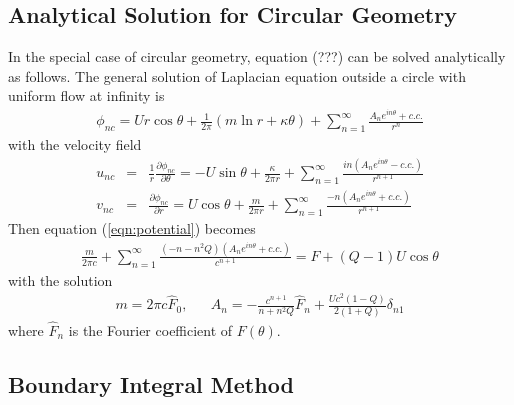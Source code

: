 \subsection{Analytical Solution for Circular Geometry}

In the special case of circular geometry, equation (???) can be solved analytically as follows. 
The general solution of Laplacian equation outside a circle with uniform flow at infinity is
 \begin{eqnarray} 
\phi_{nc} = Ur\cos\theta + \frac{1}{2\pi}(m\ln r + \kappa \theta)
+ \sum_{n=1}^{\infty} \frac{A_n e^{in\theta}+c.c. }{r^n}
\end{eqnarray}
with the velocity field
 \begin{eqnarray} 
u_{nc} & = & \frac{1}{r} \frac{\partial \phi_{nc}}{\partial \theta}  =  -U\sin\theta + \frac{\kappa}{2\pi r}
+ \sum_{n=1}^{\infty} \frac{ in (A_n e^{in\theta}-c.c.) }{r^{n+1}} \\
v_{nc} & = & \frac{\partial \phi_{nc}}{\partial r}  =   U\cos\theta + \frac{m}{2\pi r}
+ \sum_{n=1}^{\infty} \frac{ -n (A_n e^{in\theta}+c.c.) }{r^{n+1}}
\end{eqnarray}
Then equation (\ref{eqn:potential}) becomes
 \begin{eqnarray} 
\frac{m}{2\pi c} + \sum_{n=1}^{\infty} \frac{ (-n-n^2Q) (A_n e^{in\theta}+c.c.) }{c^{n+1}}
= F + (Q-1)U\cos \theta
\end{eqnarray}
with the solution
\begin{eqnarray} 
m = 2 \pi c \hat{F}_0,  & & A_n = -\frac{c^{n+1}}{n+n^2Q} \hat{F}_n + \frac{Uc^2(1-Q)}{2(1+Q)} \delta_{n1}
\end{eqnarray}
where $\hat{F}_n$ is the Fourier  coefficient of $F(\theta)$.

\subsection{Boundary Integral Method}

